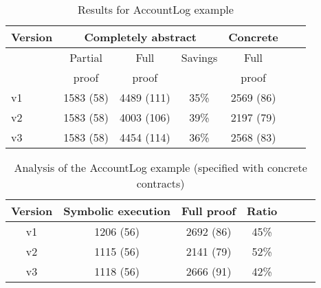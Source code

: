 \documentclass{report}
\begin{document}
\begin{table}
\begin{center}
\begin{tabular}{l@{\quad}c@{\quad}c@{\quad}c@{\quad}ccc}
\toprule
Version & \multicolumn{3}{c}{Completely abstract} & Concrete\\ \midrule
 	 		 & Partial 		& Full 			& Savings 	& Full \\ 
   			 & proof 		& proof 			&   				& proof \\ \midrule
v1	 		 & 1583 (58) 	& 4489 (111)  	& 35\%     		& 2569 (86)		\\ \midrule
v2			 & 1583 (58) & 4003 (106) 	& 39\%   		& 2197 (79) 		\\ \midrule
v3    		 & 1583 (58) & 4454 (114)  	& 36\%    		& 2568 (83)		\\ \bottomrule
\end{tabular}
\end{center}
\caption{Results for {AccountLog} example}\label{tbl:account-savings}

\label{tbl:accountlog-se-ratio}
\end{table}


\begin{table}\centering
\begin{center}
\begin{tabular}{c@{\quad}c@{\quad}c@{\quad}c@{\quad}c@{\quad}cc}
\toprule
Version	& Symbolic execution	& Full proof 	& Ratio 		\\ \midrule
v1			& 1206 (56) 						& 2692 (86)  	& 45\%    		\\ \midrule
v2			& 1115 (56)     				     & 2141 (79)  & 52\%    		\\ \midrule
v3    		& 1118 (56)                  	     & 2666 (91)  & 42\%    		\\ \bottomrule 
\end{tabular}
\end{center}
\caption{Analysis of the {AccountLog} example (specified with concrete contracts)}
\label{tbl:accountlog-se-ratio}
\end{table}
\end{document}
